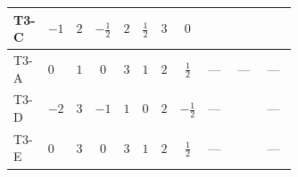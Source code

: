 \documentclass[8pt]{article}
\begin{document}
\begin{landscape}
\begin{longtable}{@{}llcccccc >{\raggedright\arraybackslash}p{0.21\linewidth} >{\raggedright\arraybackslash}p{0.21\linewidth} >{\raggedright\arraybackslash}p{0.21\linewidth}@{}}
\midrule
T3-C & $-1$ & $2$ & $-\frac{1}{2}$ & $2$ & $\frac{1}{2}$ & $3$ & $0$ & \scriptsize\adjustbox{max width=\linewidth}{$\begin{gathered} -\frac{4}{3} {\lambda_{H H^\dagger S_1^\dagger S_2^\dagger}^{\rm Cross}} (2 \left({\lambda_{H H^\dagger S_1^\dagger S_2^\dagger}^{\rm Cross}}\right)^{*}+\left({\lambda_{S_1 S_1^{\dagger 2}S_2^\dagger}}\right)^{*})\end{gathered}$} & \scriptsize\adjustbox{max width=\linewidth}{$\begin{gathered} +\frac{16}{3} {\lambda_{T3}} \left({\lambda_{T3}}\right)^{*}\end{gathered}$} & \scriptsize\adjustbox{max width=\linewidth}{$\begin{gathered} +{g_Y}^2 \left(-6 {g_2}^2-3 {\lambda_{H1}^{\rm Adj}}\right)\end{gathered}$} \\
\midrule
T3-A & $0$ & $1$ & $0$ & $3$ & $1$ & $2$ & $\frac{1}{2}$ & --- & --- & --- \\
\midrule
T3-D & $-2$ & $3$ & $-1$ & $1$ & $0$ & $2$ & $-\frac{1}{2}$ & --- & \scriptsize\adjustbox{max width=\linewidth}{$\begin{gathered} -\frac{8}{3} {\lambda_{T3}} \left({\lambda_{T3}}\right)^{*}\end{gathered}$} & --- \\
\midrule
T3-E & $0$ & $3$ & $0$ & $3$ & $1$ & $2$ & $\frac{1}{2}$ & --- & \scriptsize\adjustbox{max width=\linewidth}{$\begin{gathered} -\frac{4}{3} {\lambda_{T3}} \left({\lambda_{T3}}\right)^{*}\end{gathered}$} & --- \\
\midrule
\bottomrule
\end{longtable}
\clearpage

\end{landscape}
\end{document}
